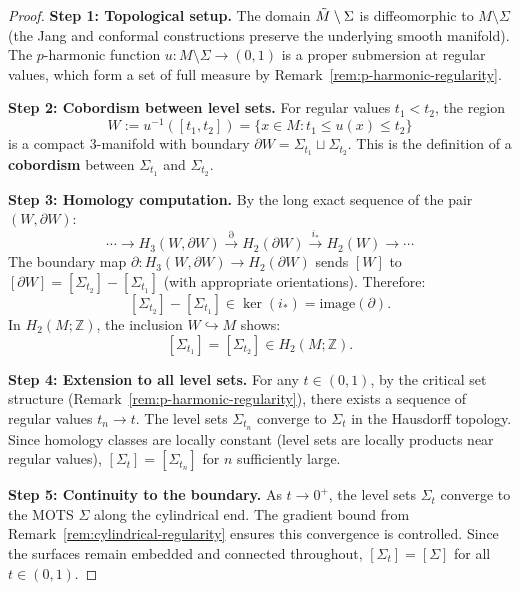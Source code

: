 \begin{proof}
\textbf{Step 1: Topological setup.}
The domain $\tilde{M} \setminus \Sigma$ is diffeomorphic to $M \setminus \Sigma$ (the Jang and conformal constructions preserve the underlying smooth manifold). The $p$-harmonic function $u: M \setminus \Sigma \to (0, 1)$ is a proper submersion at regular values, which form a set of full measure by Remark~\ref{rem:p-harmonic-regularity}.

\textbf{Step 2: Cobordism between level sets.}
For regular values $t_1 < t_2$, the region
\[
W := u^{-1}([t_1, t_2]) = \{x \in M : t_1 \leq u(x) \leq t_2\}
\]
is a compact 3-manifold with boundary $\partial W = \Sigma_{t_1} \sqcup \Sigma_{t_2}$. This is the definition of a \textbf{cobordism} between $\Sigma_{t_1}$ and $\Sigma_{t_2}$.

\textbf{Step 3: Homology computation.}
By the long exact sequence of the pair $(W, \partial W)$:
\[
\cdots \to H_3(W, \partial W) \xrightarrow{\partial} H_2(\partial W) \xrightarrow{i_*} H_2(W) \to \cdots
\]
The boundary map $\partial: H_3(W, \partial W) \to H_2(\partial W)$ sends $[W]$ to $[\partial W] = [\Sigma_{t_2}] - [\Sigma_{t_1}]$ (with appropriate orientations). Therefore:
\[
[\Sigma_{t_2}] - [\Sigma_{t_1}] \in \ker(i_*) = \text{image}(\partial).
\]
In $H_2(M; \mathbb{Z})$, the inclusion $W \hookrightarrow M$ shows:
\[
[\Sigma_{t_1}] = [\Sigma_{t_2}] \in H_2(M; \mathbb{Z}).
\]

\textbf{Step 4: Extension to all level sets.}
For any $t \in (0, 1)$, by the critical set structure (Remark~\ref{rem:p-harmonic-regularity}), there exists a sequence of regular values $t_n \to t$. The level sets $\Sigma_{t_n}$ converge to $\Sigma_t$ in the Hausdorff topology. Since homology classes are locally constant (level sets are locally products near regular values), $[\Sigma_t] = [\Sigma_{t_n}]$ for $n$ sufficiently large.

\textbf{Step 5: Continuity to the boundary.}
As $t \to 0^+$, the level sets $\Sigma_t$ converge to the MOTS $\Sigma$ along the cylindrical end. The gradient bound from Remark~\ref{rem:cylindrical-regularity} ensures this convergence is controlled. Since the surfaces remain embedded and connected throughout, $[\Sigma_t] = [\Sigma]$ for all $t \in (0, 1)$.


\end{proof}
